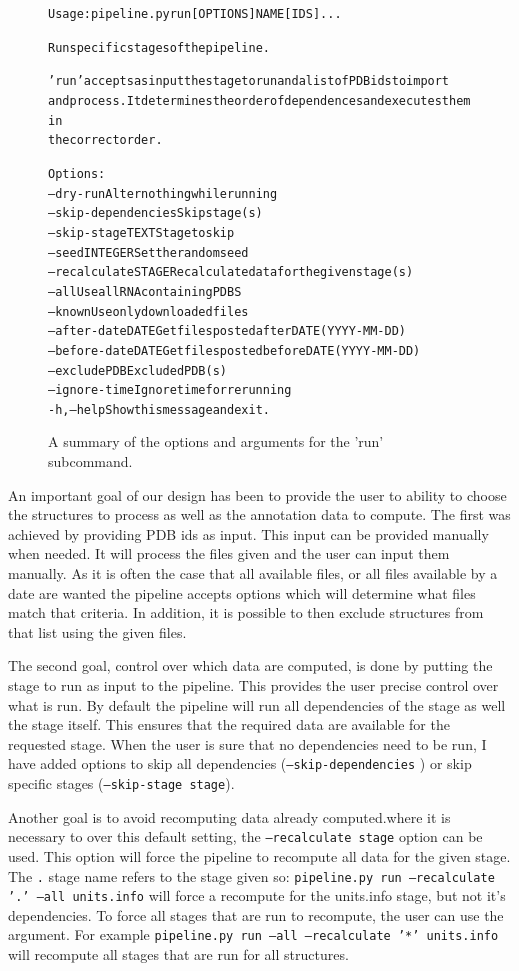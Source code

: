 \begin{figure}
\begin{alltt}
Usage: pipeline.py run [OPTIONS] NAME [IDS]...

  Run specific stages of the pipeline.

  'run' accepts as input the stage to run and a list of PDB ids to import
  and process. It determines the order of dependences and executes them in
  the correct order.

Options:
  --dry-run            Alter nothing while running
  --skip-dependencies  Skip stage(s)
  --skip-stage TEXT    Stage to skip
  --seed INTEGER       Set the random seed
  --recalculate STAGE  Recalculate data for the given stage(s)
  --all                Use all RNA containing PDBS
  --known              Use only downloaded files
  --after-date DATE    Get files posted after DATE (YYYY-MM-DD)
  --before-date DATE   Get files posted before DATE (YYYY-MM-DD)
  --exclude PDB        Excluded PDB(s)
  --ignore-time        Ignore time for rerunning
  -h, --help           Show this message and exit.
\end{alltt}
\caption{A summary of the options and arguments for the 'run' subcommand.}
\label{fig:running-options}
\end{figure}

An important goal of our design has been to provide the user to ability to
choose the structures to process as well as the annotation data to compute. The
first was achieved by providing PDB ids as input. This input can be provided
manually when needed. It will process the files given and the user can input
them manually. As it is often the case that all available files, or all files
available by a date are wanted the pipeline accepts options which will determine
what files match that criteria. In addition, it is possible to then exclude
structures from that list using the given files.

The second goal, control over which data are computed, is done by putting the
stage to run as input to the pipeline. This provides the user precise control
over what is run. By default the pipeline will run all dependencies of the stage
as well the stage itself. This ensures that the required data are available for
the requested stage. When the user is sure that no dependencies need to be run,
I have added options to skip all dependencies ({\tt --skip-dependencies} ) or skip
specific stages ({\tt --skip-stage stage}).

Another goal is to avoid recomputing data already computed.where it is necessary
to over this default setting, the {\tt --recalculate stage} option can be used.
This option will force the pipeline to recompute all data for the given stage.
The {\tt .} stage name refers to the stage given so: {\tt pipeline.py run
--recalculate '.' --all units.info} will force a recompute for the units.info
stage, but not it's dependencies. To force all stages that are run to recompute,
the user can use the {\tt *} argument. For example {\tt pipeline.py run --all
--recalculate '*' units.info} will recompute all stages that are run for all
structures.

